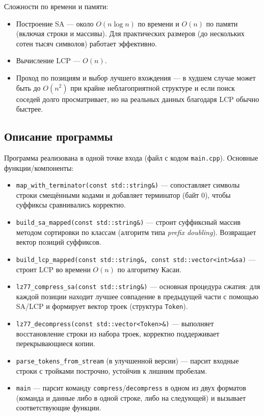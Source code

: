 \documentclass[12pt]{article}
\begin{document}
Сложности по времени и памяти:
\begin{itemize}
  \item Построение SA — около $O(n\log n)$ по времени и $O(n)$ по памяти (включая строки и массивы). Для практических размеров (до нескольких сотен тысяч символов) работает эффективно.
  \item Вычисление LCP — $O(n)$.
  \item Проход по позициям и выбор лучшего вхождения — в худшем случае может быть до $O(n^2)$ при крайне неблагоприятной структуре и если поиск соседей долго просматривает, но на реальных данных благодаря LCP обычно быстрее.
\end{itemize}

\subsection*{Описание программы}

Программа реализована в одной точке входа (файл с кодом \texttt{main.cpp}). Основные функции/компоненты:
\begin{itemize}
  \item \texttt{map\_with\_terminator(const std::string\&)} --- сопоставляет символы строки смещёнными кодами и добавляет терминатор (байт 0), чтобы суффиксы сравнивались корректно.
  \item \texttt{build\_sa\_mapped(const std::string\&)} --- строит суффиксный массив методом сортировки по классам (алгоритм типа \textit{prefix doubling}). Возвращает вектор позиций суффиксов.
  \item \texttt{build\_lcp\_mapped(const std::string\&, const std::vector<int>\&sa)} --- строит LCP во времени $O(n)$ по алгоритму Касаи.
  \item \texttt{lz77\_compress\_sa(const std::string\&)} --- основная процедура сжатия: для каждой позиции находит лучшее совпадение в предыдущей части с помощью SA/LCP и формирует вектор троек (структура \texttt{Token}).
  \item \texttt{lz77\_decompress(const std::vector<Token>\&)} --- выполняет восстановление строки из набора троек, корректно поддерживает перекрывающиеся копии.
  \item \texttt{parse\_tokens\_from\_stream} (в улучшенной версии) --- парсит входные строки с тройками построчно, устойчив к лишним пробелам.
  \item \texttt{main} --- парсит команду \texttt{compress}/\texttt{decompress} в одном из двух форматов (команда и данные либо в одной строке, либо на следующей) и вызывает соответствующие функции.
\end{itemize}
\end{document}
